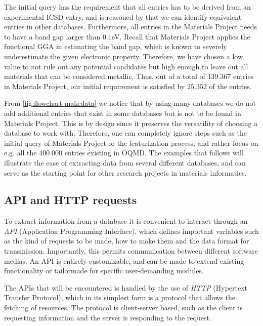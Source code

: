 

The initial query has the requirement that all entries has to be derived from an experimental ICSD entry, and is reasoned by that we can identify equivalent entries in other databases. Furthermore, all entries in the Materials Project needs to have a band gap larger than $0.1$eV. Recall that Materials Project applies the functional GGA in estimating the band gap, which is known to severely underestimate the given electronic property. Therefore, we have chosen a low value to not rule out any potential candidates but high enough to leave out all materials that can be considered metallic. Thus, out of a total of $139.367$ entries in Materials Project, our initial requirement is satisfied by $25.352$ of the entries.

From \autoref{fig:flowchart-makedata} we notice that by using many databases we do not add additional entries that exist in some databases but is not to be found in Materials Project. This is by design since it preserves the versatility of choosing a database to work with. Therefore, one can completely ignore steps such as the initial query of Materials Project or the featurization process, and rather focus on e.g. all the $400.000$ entries existing in OQMD. The examples that follows will illustrate the ease of extracting data from several different databases, and can serve as the starting point for other research projects in materials informatics.

\subsection{API and HTTP requests}

To extract information from a database it is convenient to interact through an \textit{API} (Application Programming Interface), which defines important variables such as the kind of requests to be made, how to make them and the data format for transmission. Importantly, this permits communication between different software medias. An API is entirely customizable, and can be made to extend existing functionality or tailormade for specific user-demanding modules.

The APIs that will be encountered is handled by the use of \textit{HTTP} (Hypertext Transfer Protocol), which in its simplest form is a protocol that allows the fetching of resources. The protocol is client-server based, such as the client is requesting information and the server is responding to the request.

